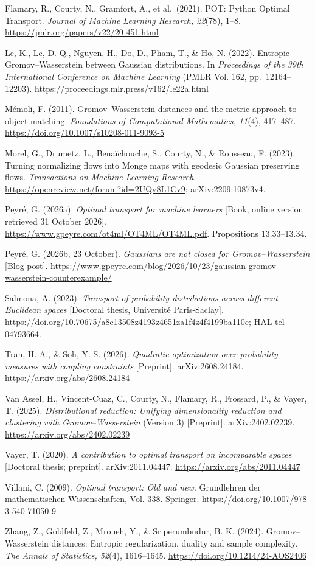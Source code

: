 \documentclass[
  british,
  11pt,
  a4paper,
]{article}
\begin{document}
Flamary, R., Courty, N., Gramfort, A., et al.~(2021). POT: Python
Optimal Transport. \emph{Journal of Machine Learning Research, 22}(78),
1--8. \url{https://jmlr.org/papers/v22/20-451.html}

Le, K., Le, D. Q., Nguyen, H., Do, D., Pham, T., \& Ho, N. (2022).
Entropic Gromov--Wasserstein between Gaussian distributions. In
\emph{Proceedings of the 39th International Conference on Machine
Learning} (PMLR Vol. 162, pp.~12164--12203).
\url{https://proceedings.mlr.press/v162/le22a.html}

Mémoli, F. (2011). Gromov--Wasserstein distances and the metric approach
to object matching. \emph{Foundations of Computational Mathematics,
11}(4), 417--487. \url{https://doi.org/10.1007/s10208-011-9093-5}

Morel, G., Drumetz, L., Benaïchouche, S., Courty, N., \& Rousseau, F.
(2023). Turning normalizing flows into Monge maps with geodesic Gaussian
preserving flows. \emph{Transactions on Machine Learning Research}.
\url{https://openreview.net/forum?id=2UQv8L1Cv9}; arXiv:2209.10873v4.

Peyré, G. (2026a). \emph{Optimal transport for machine learners}
{[}Book, online version retrieved 31 October 2026{]}.
\url{https://www.gpeyre.com/ot4ml/OT4ML/OT4ML.pdf}. Propositions
13.33--13.34.

Peyré, G. (2026b, 23 October). \emph{Gaussians are not closed for
Gromov--Wasserstein} {[}Blog post{]}.
\url{https://www.gpeyre.com/blog/2026/10/23/gaussian-gromov-wasserstein-counterexample/}

Salmona, A. (2023). \emph{Transport of probability distributions across
different Euclidean spaces} {[}Doctoral thesis, Université
Paris-Saclay{]}.
\url{https://doi.org/10.70675/a8e13508z4193z4651za1f4z4f4199ba110c}; HAL
tel-04793664.

Tran, H. A., \& Soh, Y. S. (2026). \emph{Quadratic optimization over
probability measures with coupling constraints} {[}Preprint{]}.
arXiv:2608.24184. \url{https://arxiv.org/abs/2608.24184}

Van Assel, H., Vincent-Cuaz, C., Courty, N., Flamary, R., Frossard, P.,
\& Vayer, T. (2025). \emph{Distributional reduction: Unifying
dimensionality reduction and clustering with Gromov--Wasserstein}
(Version 3) {[}Preprint{]}. arXiv:2402.02239.
\url{https://arxiv.org/abs/2402.02239}

Vayer, T. (2020). \emph{A contribution to optimal transport on
incomparable spaces} {[}Doctoral thesis; preprint{]}. arXiv:2011.04447.
\url{https://arxiv.org/abs/2011.04447}

Villani, C. (2009). \emph{Optimal transport: Old and new}. Grundlehren
der mathematischen Wissenschaften, Vol. 338. Springer.
\url{https://doi.org/10.1007/978-3-540-71050-9}

Zhang, Z., Goldfeld, Z., Mroueh, Y., \& Sriperumbudur, B. K. (2024).
Gromov--Wasserstein distances: Entropic regularization, duality and
sample complexity. \emph{The Annals of Statistics, 52}(4), 1616--1645.
\url{https://doi.org/10.1214/24-AOS2406}
\end{document}
